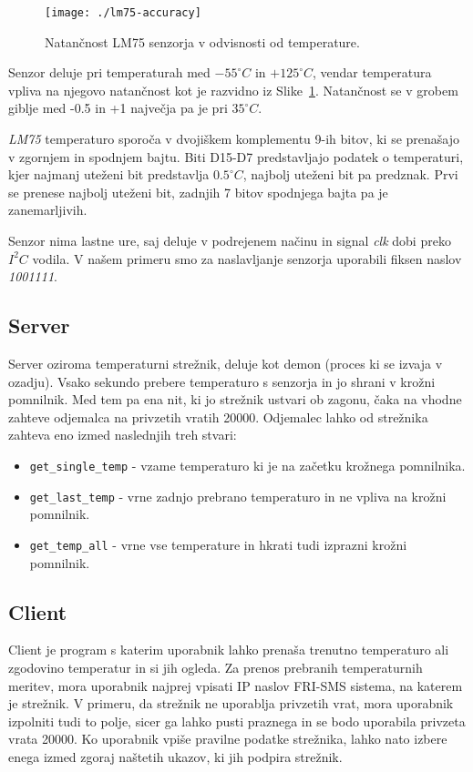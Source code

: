 \documentclass[10pt,a4paper]{article}
\begin{document}
\begin{figure}[hbtp]
  \centering
  \texttt{[image: ./lm75-accuracy]}
  \caption{Natančnost LM75 senzorja v odvisnosti od temperature.}
  \label{fig:lm75accuracy}
\end{figure}

Senzor deluje pri temperaturah med {$-55^{\circ}C$} in {$+125^{\circ}C$}, vendar temperatura vpliva na njegovo natančnost kot je razvidno iz Slike~\ref{fig:lm75accuracy}. Natančnost se v grobem giblje med -0.5 in +1 največja pa je pri {$35^{\circ}C$}.

\emph{LM75} temperaturo sporoča v dvojiškem komplementu 9-ih bitov, ki se prenašajo v zgornjem in spodnjem bajtu. Biti D15-D7 predstavljajo podatek o temperaturi, kjer najmanj uteženi bit predstavlja {$0.5^{\circ}C$}, najbolj uteženi bit pa predznak. Prvi se prenese najbolj uteženi bit, zadnjih 7 bitov spodnjega bajta pa je zanemarljivih.

Senzor nima lastne ure, saj deluje v podrejenem načinu in signal \emph{clk} dobi preko {$I^2C$} vodila. V našem primeru smo za naslavljanje senzorja uporabili fiksen naslov \emph{1001111}.

\subsection{Server}
Server oziroma temperaturni strežnik, deluje kot demon (proces ki se izvaja v ozadju). Vsako sekundo prebere temperaturo s senzorja in jo shrani v krožni pomnilnik. Med tem pa ena nit, ki jo strežnik ustvari ob zagonu, čaka na vhodne zahteve odjemalca na privzetih vratih 20000. Odjemalec lahko od strežnika zahteva eno izmed naslednjih treh stvari:
\begin{itemize}
	\item \verb|get_single_temp| - vzame temperaturo ki je na začetku krožnega pomnilnika.
	\item \verb|get_last_temp| - vrne zadnjo prebrano temperaturo in ne vpliva na krožni pomnilnik.
	\item \verb|get_temp_all| - vrne vse temperature in hkrati tudi izprazni krožni pomnilnik.
\end{itemize}

\subsection{Client}
Client je program s katerim uporabnik lahko prenaša trenutno temperaturo ali zgodovino temperatur in si jih ogleda. Za prenos prebranih temperaturnih meritev, mora uporabnik najprej vpisati IP naslov FRI-SMS sistema, na katerem je strežnik. V primeru, da strežnik ne uporablja privzetih vrat, mora uporabnik izpolniti tudi to polje, sicer ga lahko pusti praznega in se bodo uporabila privzeta vrata 20000. Ko uporabnik vpiše pravilne podatke strežnika, lahko nato izbere enega izmed zgoraj naštetih ukazov, ki jih podpira strežnik.
\end{document}
